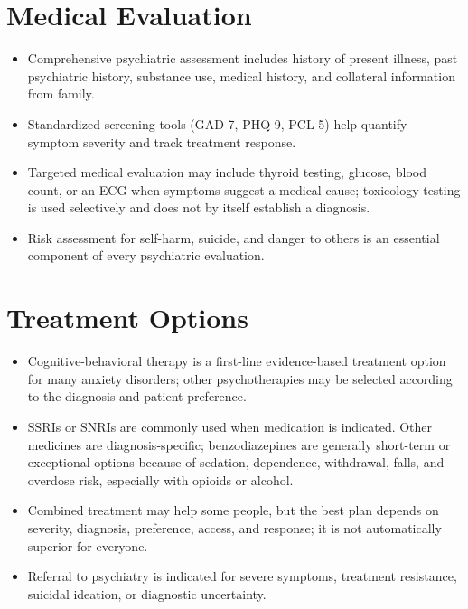 \section*{Medical Evaluation}
\begin{itemize}
 \item Comprehensive psychiatric assessment includes history of present illness, past psychiatric history, substance use, medical history, and collateral information from family.
 \item Standardized screening tools (GAD-7, PHQ-9, PCL-5) help quantify symptom severity and track treatment response.
 \item Targeted medical evaluation may include thyroid testing, glucose, blood count, or an ECG when symptoms suggest a medical cause; toxicology testing is used selectively and does not by itself establish a diagnosis.
 \item Risk assessment for self-harm, suicide, and danger to others is an essential component of every psychiatric evaluation.
\end{itemize}

\section*{Treatment Options}
\begin{itemize}
 \item Cognitive-behavioral therapy is a first-line evidence-based treatment option for many anxiety disorders; other psychotherapies may be selected according to the diagnosis and patient preference.
 \item SSRIs or SNRIs are commonly used when medication is indicated. Other medicines are diagnosis-specific; benzodiazepines are generally short-term or exceptional options because of sedation, dependence, withdrawal, falls, and overdose risk, especially with opioids or alcohol.
 \item Combined treatment may help some people, but the best plan depends on severity, diagnosis, preference, access, and response; it is not automatically superior for everyone.
 \item Referral to psychiatry is indicated for severe symptoms, treatment resistance, suicidal ideation, or diagnostic uncertainty.
\end{itemize}

